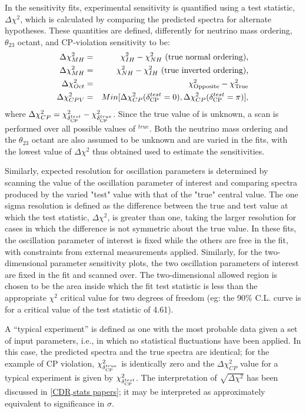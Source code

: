 In the sensitivity fits, experimental sensitivity is quantified using a test statistic, $\Delta\chi^2$, which is calculated by comparing the predicted spectra for alternate hypotheses.  These quantities are defined, differently for neutrino mass ordering, $\theta_{23}$ octant, and CP-violation sensitivity to be:
\begin{eqnarray}
\Delta\chi^2_{MH} & = & \chi^2_{IH} - \chi^2_{NH}\textrm{ (true normal ordering),}\label{eq:dx2_MH}\\
\Delta\chi^2_{MH} & = & \chi^2_{NH} - \chi^2_{IH}\textrm{ (true inverted ordering),}\\
\Delta\chi^2_{Oct} & = & \chi^2_{\textrm{Opposite}} - \chi^2_{\textrm{True}} \\
\Delta\chi^2_{CPV} & = & Min[\Delta\chi^2_{CP}(\delta_{\rm CP}^{test}=0),\Delta\chi^2_{CP}(\delta_{\rm CP}^{test}=\pi)],
\end{eqnarray}
where $\Delta\chi^2_{CP} = \chi^{2}_{\delta_{\rm CP}^{test}} - \chi^2_{\delta_{\rm CP}^{true}}$. Since the true value of \deltacp is unknown, a scan is performed over all possible values of \deltacp$^{true}$. Both the neutrino mass ordering and the $\theta_{23}$ octant are also assumed to be unknown and are varied in the fits, with the lowest value of $\Delta\chi^2$ thus obtained used to estimate the sensitivities. 

Similarly, expected resolution for oscillation parameters is determined by scanning the value of the oscillation parameter of interest and comparing spectra produced by the varied "test" value with that of the "true" central value. The one sigma resolution is defined as the difference between the true and test value at which the test statistic, $\Delta\chi^2$, is greater than one, taking the larger resolution for cases in which the difference is not symmetric about the true value. In these fits, the oscillation parameter of interest is fixed while the others are free in the fit, with constraints from external measurements applied. Similarly, for the two-dimensional parameter sensitivity plots, the two oscillation parameters of interest are fixed in the fit and scanned over. The two-dimensional allowed region is chosen to be the area inside which the fit test statistic is less than the appropriate $\chi^2$ critical value for two degrees of freedom (eg: the 90\% C.L. curve is for a critical value of the test statistic of 4.61).

A ``typical experiment'' is defined as one with the most probable data given a set of input parameters, i.e., in which no statistical fluctuations have been applied. In this case, the predicted spectra and the true spectra are identical; for the example of CP violation, $\chi^2_{\delta_{\rm CP}^{true}}$ is identically zero and the $\Delta\chi^2_{CP}$ value for a typical experiment is given by $\chi^2_{\delta_{\rm CP}^{test}}$. The interpretation of $\sqrt{\Delta\chi^2}$ has been discussed in \ref{CDR,stats papers}; it may be interpreted as approximately equivalent to significance in $\sigma$. 

